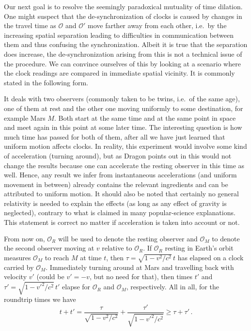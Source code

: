 \documentclass[../relativity_main.tex]{subfiles}
\begin{document}
Our next goal is to resolve the seemingly paradoxical mutuality of time dilation. One might suspect that the de-synchronization of clocks is caused by changes in the travel time as $\mathcal{O}$ and $\mathcal{O}'$ move farther away from each other, i.e.~by the increasing spatial separation leading to difficulties in communication between them and thus confusing the synchronization. Albeit it is true that the separation does increase, the de-synchronization arising from this is not a technical issue of the procedure. We can convince ourselves of this by looking at a scenario where the clock readings are compared in immediate spatial vicinity. It is commonly stated in the following form.
\begin{ex}\label{ex:twin_paradox_1}
	It deals with two observers (commonly taken to be twins, i.e.~of the same age), one of them at rest and the other one moving uniformly to some destination, for example Mars $M$. Both start at the same time and at the same point in space and meet again in this point at some later time. The interesting question is how much time has passed for both of them, after all we have just learned that uniform motion affects clocks. In reality, this experiment would involve some kind of acceleration (turning around), but as Dragon points out in \cite{dragon_geometry_srt} this would not change the results because one can accelerate the resting observer in this time as well. Hence, any result we infer from instantaneous accelerations (and uniform movement in between) already contains the relevant ingredients and can be attributed to uniform motion. It should also be noted that certainly no general relativity is needed to explain the effects (as long as any effect of gravity is neglected), contrary to what is claimed in many popular-science explanations. This statement is correct no matter if acceleration is taken into account or not.
	
	From now on, $\mathcal{O}_R$ will be used to denote the resting observer and $\mathcal{O}_M$ to denote the second observer moving at $v$ relative to $\mathcal{O}_R$. If $\mathcal{O}_R$ resting in Earth's orbit measures $\mathcal{O}_M$ to reach $M$ at time $t$, then $\tau = \sqrt{1 - v^2 / c^2} \, t$ has elapsed on a clock carried by $\mathcal{O}_M$. Immediately turning around at Mars and travelling back with velocity $v'$ (could be $v' = -v$, but no need for that), then times $t'$ and $\tau' = \sqrt{1 - v'^2 / c^2} \, t'$ elapse for $\mathcal{O}_R$ and $\mathcal{O}_M$, respectively. All in all, for the roundtrip times we have
	\begin{equation*}
		t + t' = \frac{\tau}{\sqrt{1 - v^2 / c^2}} + \frac{\tau'}{\sqrt{1 - v'^2 / c^2}} \geq \tau + \tau' \, .
	\end{equation*}


\end{ex}
\end{document}
